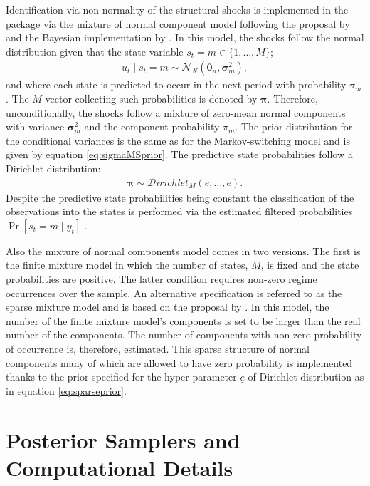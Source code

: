\documentclass[
  nojss]{jss}
\begin{document}
Identification via non-normality of the structural shocks is implemented
in the package via the mixture of normal component model following the
proposal by \cite{Lanne2010} and the Bayesian implementation by
\cite{Wozniak2015}. In this model, the shocks follow the normal
distribution given that the state variable \(s_t=m\in\{1,\dots,M\}\);
\begin{align}
u_t\mid s_t=m \sim\mathcal{N}_N\left(\mathbf{0}_n, \boldsymbol{\sigma}_m^2 \right),
\end{align} and where each state is predicted to occur in the next
period with probability \(\pi_m\). The \(M\)-vector collecting such
probabilities is denoted by \(\boldsymbol\pi\). Therefore,
unconditionally, the shocks follow a mixture of zero-mean normal
components with variance \(\boldsymbol{\sigma}_m^2\) and the component
probability \(\pi_m\). The prior distribution for the conditional
variances is the same as for the Markov-switching model and is given by
equation \eqref{eq:sigmaMSprior}. The predictive state probabilities
follow a Dirichlet distribution: \begin{align}
\boldsymbol{\pi} \sim\mathcal{D}irichlet_M(\underline{e}, \dots, \underline{e}).\label{eq:dirichletmix}
\end{align} Despite the predictive state probabilities being constant
the classification of the observations into the states is performed via
the estimated filtered probabilities \(\Pr[s_t=m\mid y_t]\)
\citep[see][for a recent review of the method]{song2021markov}.

Also the mixture of normal components model comes in two versions. The
first is the finite mixture model
\citep[see e.g.][]{FruhwirthSchnatter2006} in which the number of
states, \(M\), is fixed and the state probabilities are positive. The
latter condition requires non-zero regime occurrences over the sample.
An alternative specification is referred to as the sparse mixture model
and is based on the proposal by \cite{malsiner2016model}. In this model,
the number of the finite mixture model's components is set to be larger
than the real number of the components. The number of components with
non-zero probability of occurrence is, therefore, estimated. This sparse
structure of normal components many of which are allowed to have zero
probability is implemented thanks to the prior specified for the
hyper-parameter \(\underline{e}\) of Dirichlet distribution as in
equation \eqref{eq:sparseprior}.

\section{Posterior Samplers and Computational Details}\label{sec:posterior}
\end{document}
